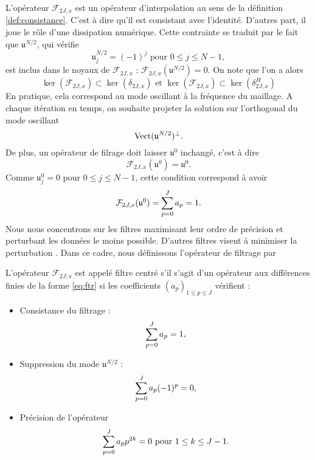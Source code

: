 L'opérateur $\mathcal{F}_{2J,x}$ est un opérateur d'interpolation au sens de la définition \ref{def:consistance}. C'est à dire qu'il est consistant avec l'identité.
D'autres part, il joue le rôle d'une dissipation numérique. Cette contrainte se traduit par le fait que $\mathfrak{u}^{N/2}$, qui vérifie
\begin{equation}
\mathfrak{u}^{N/2}_j = (-1)^j \text{ pour } 0 \leq j \leq N-1,
\end{equation}
est inclus dans le noyaux de $\mathcal{F}_{2J,x}$ : $\mathcal{F}_{2J,x}(\mathfrak{u}^{N/2}) = \mathfrak{0}$. On note que l'on a alors
\begin{equation}
\ker (\mathcal{F}_{2J,x} ) \subset \ker (\delta_{2J,x} ) \text{ et } \ker (\mathcal{F}_{2J,x} ) \subset \ker (\delta_{2J,x}^H )
\end{equation}
En pratique, cela correspond au mode oscillant à la fréquence du maillage. A chaque itération en temps, on souhaite projeter la solution sur l'orthogonal du mode oscillant 
\begin{equation}
\text{Vect} (\mathfrak{u}^{N/2})^{\perp}.
\end{equation}
De plus, un opérateur de filrage doit laisser $\mathfrak{u}^0$ inchangé, c'est à dire
\begin{equation}
\mathcal{F}_{2J,x}(\mathfrak{u}^{0}) = \mathfrak{u}^{0}.
\end{equation}
Comme $\mathfrak{u}^0_j = 0$ pour $0 \leq j \leq N-1$, cette condition correspond à avoir
\begin{equation}
\mathcal{F}_{2J,x}(\mathfrak{u}^{0}) = \displaystyle\sum\limits_{p=0}^J a_p = 1.
\end{equation}
Nous nous concentrons sur les filtres maximisant leur ordre de précision \cite{Redonnet2001} et perturbant les données le moins possible. D'autres filtres visent à minimiser la perturbation \cite{Bogey2004}. Dans ce cadre, nous définissons l'opérateur de filtrage par 

\begin{definition}
L'opérateur $\mathcal{F}_{2J,x}$ est appelé filtre centré s'il s'agit d'un opérateur aux différences finies de la forme \eqref{eq:ftr} si les coefficients $(a_p)_{1 \leq p \leq J}$ vérifient :
\begin{itemize}
\item Consistance du filtrage :
\begin{equation}
\displaystyle\sum\limits_{p=0}^J a_p = 1,
\label{eq:ftr_consistance}
\end{equation}
\item Suppression du mode $\mathfrak{u}^{N/2}$ :
\begin{equation}
\displaystyle\sum\limits_{p=0}^J a_p (-1)^p = 0,
\label{eq:ftr_filtrage}
\end{equation}
\item Précision de l'opérateur
\begin{equation}
\displaystyle\sum\limits_{p=0}^J a_p p^{2k} = 0 \text{ pour } 1 \leq k \leq J-1.
\label{eq:ftr_precision}
\end{equation}
\end{itemize}
\end{definition}

